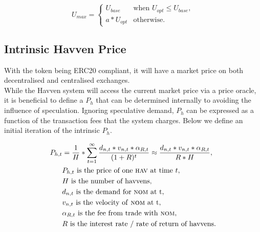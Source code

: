\[
U_{max} = 
\begin{cases}
 U_{base} &\mbox{when } U_{opt} \leq U_{base}, \\[1em]
 a * U_{opt} &\mbox{otherwise}.
 \end{cases}
\]


\newpage

\subsection{Intrinsic Havven Price} With the \HAV{} token being ERC20 compliant, it will have a market price on both decentralised and centralised exchanges. \\

\noindent While the Havven system will access the current market price via a price oracle, it is beneficial to define a $P_h$ that can be determined internally to avoiding the influence of speculation. Ignoring speculative demand, $P_h$ can be expressed as a function of the transaction fees that the system charges. Below we define an initial iteration of the intrinsic $P_h$.

\begin{align*} 
P_{h,t} &= \frac{1}{H}* \sum\limits_{t=1}^\infty \frac{d_{n,t} *v_{n,t} * \alpha_{R,t}}{(1+R)^t} \approx \frac{d_{n,t} *v_{n,t} * \alpha_{R,t}}{R * H}, \\
& P_{h,t} \text{ is the price of one \textsc{hav}{} at time } t, \\
& H \text{ is the number of havvens}, \\
& d_{n,t} \text{ is the demand for \textsc{nom}{} at t}, \\
& v_{n,t} \text{ is the velocity of \textsc{nom}{} at t}, \\
& \alpha_{R,t} \text{ is the fee from trade with \textsc{nom}{}}, \\
& R \text{ is the interest rate / rate of return of havvens}. \\
\end{align*}

